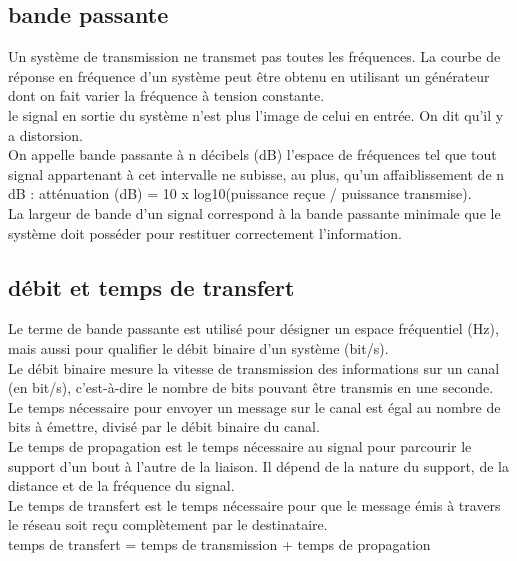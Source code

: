 \documentclass[a4paper, 9pt]{article}
\begin{document}
        \subsection{bande passante}
            Un système de transmission ne transmet pas toutes les fréquences. La courbe de réponse en fréquence d’un système peut être obtenu en utilisant 
            un générateur dont on fait varier la fréquence à tension constante.\\
            le signal en sortie du système n’est plus l’image de celui en entrée. On dit qu’il y a distorsion.\\
            On appelle bande passante à n décibels (dB) l’espace de fréquences tel que tout signal appartenant à cet intervalle ne subisse, au plus, 
            qu’un affaiblissement de n dB : atténuation (dB) = 10 x log10(puissance reçue / puissance transmise).\\
            La largeur de bande d’un signal correspond à la bande passante minimale que le système doit posséder pour restituer correctement l’information.
        \subsection{débit et temps de transfert}
        Le terme de bande passante est utilisé pour désigner un espace fréquentiel (Hz), mais aussi pour qualifier le débit binaire d’un système (bit/s).\\
        Le débit binaire mesure la vitesse de transmission des informations sur un canal (en bit/s), c’est-à-dire le nombre de bits pouvant 
        être transmis en une seconde.\\
        Le temps nécessaire pour envoyer un message sur le canal est égal au nombre de bits à émettre, divisé par le débit binaire du canal.\\
        Le temps de propagation est le temps nécessaire au signal pour parcourir le support d’un bout à l’autre de la liaison. Il dépend de la nature 
        du support, de la distance et de la fréquence du signal.\\
        Le temps de transfert est le temps nécessaire pour que le message émis à travers le réseau soit reçu complètement par le destinataire.\\
        temps de transfert = temps de transmission + temps de propagation
            
\end{document}
